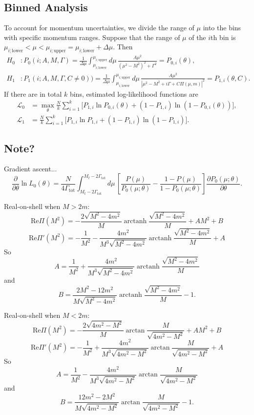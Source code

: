 \documentclass[10pt]{article}
\theoremstyle{definition}
\theoremstyle{remark}
\DeclareMathOperator{\arctanh}{arctanh}
\begin{document}
	\subsection{Binned Analysis}
	To account for momentum uncertainties, we divide the range of $\mu$ into the bins with specific momentum ranges.
	Suppose that the range of $\mu$ of the $i$th bin is $\mu_{i;\mathrm{lower}}<\mu<\mu_{i;\mathrm{upper}}=\mu_{i;\mathrm{lower}}+\Delta\mu$.
	Then
	\begin{align*}
		H_{0}&:P_{0}(i;A,M,\Gamma)=\frac{1}{\Delta\mu}\int_{\mu_{i;\mathrm{lower}}}^{\mu_{i;\mathrm{upper}}}d\mu\,\frac{A\mu^{2}}{(\mu^{2}-M^{2})^{2}+\Gamma^{2}}=P_{0,i}(\theta),\\
		H_{1}&:P_{1}(i;A,M,\Gamma,C\neq0))=\frac{1}{\Delta\mu}\int_{\mu_{i;\mathrm{lower}}}^{\mu_{i;\mathrm{upper}}}d\mu\,\frac{A\mu^{2}}{|\mu^{2}-M^{2}+i\Gamma+C\Pi(\mu,m)|^{2}}=P_{1,i}(\theta,C).
	\end{align*}
	If there are in total $k$ bins, estimated log-likelihood functions are
	\begin{align*}
		\mathcal{L}_{0}&=\max_{\theta}\frac{N}{k}\sum_{i=1}^{k}\Big[P_{1,i}\ln P_{0,i}(\theta)+(1-P_{1,i})\ln(1-P_{0,i}(\theta))\Big],\\
		\mathcal{L}_{1}&=\frac{N}{k}\sum_{i=1}^{k}\Big[P_{1,i}\ln P_{1,i}+(1-P_{1,i})\ln(1-P_{1,i})\Big].
	\end{align*}
	
	
	\subsection{Note?}
	Gradient ascent...
	\[\frac{\partial}{\partial\theta}\ln L_{0}(\theta)=\frac{N}{4\Gamma_{\mathrm{tot}}}\int_{M_{t}-2\Gamma_{\mathrm{tot}}}^{M_{t}-2\Gamma_{\mathrm{tot}}}d\mu\,\left[\frac{P(\mu)}{P_{0}(\mu;\theta)}-\frac{1-P(\mu)}{1-P_{0}(\mu;\theta)}\right]\frac{\partial P_{0}(\mu;\theta)}{\partial\theta}.\]
	
	Real-on-shell when $M>2m$:
	\[\mathrm{Re}\Pi(M^{2})=-\frac{2\sqrt{M^{2}-4m^{2}}}{M}\arctanh\frac{\sqrt{M^{2}-4m^{2}}}{M}+AM^{2}+B\]
	\[\mathrm{Re}\Pi'(M^{2})=-\frac{1}{M^{2}}-\frac{4m^{2}}{M^{3}\sqrt{M^{2}-4m^{2}}}\arctanh\frac{\sqrt{M^{2}-4m^{2}}}{M}+A\]
	So
	\[A=\frac{1}{M^{2}}+\frac{4m^{2}}{M^{3}\sqrt{M^{2}-4m^{2}}}\arctanh\frac{\sqrt{M^{2}-4m^{2}}}{M}\]
	and
	\[B=\frac{2M^{2}-12m^{2}}{M\sqrt{M^{2}-4m^{2}}}\arctanh\frac{\sqrt{M^{2}-4m^{2}}}{M}-1.\]
	
	Real-on-shell when $M<2m$:
	\[\mathrm{Re}\Pi(M^{2})=-\frac{2\sqrt{4m^{2}-M^{2}}}{M}\arctan\frac{M}{\sqrt{4m^{2}-M^{2}}}+AM^{2}+B\]
	\[\mathrm{Re}\Pi'(M^{2})=-\frac{1}{M^{2}}+\frac{4m^{2}}{M^{3}\sqrt{4m^{2}-M^{2}}}\arctan\frac{M}{\sqrt{4m^{2}-M^{2}}}+A\]
	So
	\[A=\frac{1}{M^{2}}-\frac{4m^{2}}{M^{3}\sqrt{4m^{2}-M^{2}}}\arctan\frac{M}{\sqrt{4m^{2}-M^{2}}}\]
	and
	\[B=\frac{12m^{2}-2M^{2}}{M\sqrt{4m^{2}-M^{2}}}\arctan\frac{M}{\sqrt{4m^{2}-M^{2}}}-1.\]
	
\end{document}
